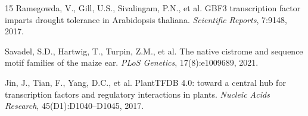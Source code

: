 \documentclass[11pt,a4paper]{article}
\begin{document}
\begin{thebibliography}{15}
Ramegowda, V., Gill, U.S., Sivalingam, P.N., et al.
\newblock GBF3 transcription factor imparts drought tolerance in Arabidopsis thaliana.
\newblock \textit{Scientific Reports}, 7:9148, 2017.

Savadel, S.D., Hartwig, T., Turpin, Z.M., et al.
\newblock The native cistrome and sequence motif families of the maize ear.
\newblock \textit{PLoS Genetics}, 17(8):e1009689, 2021.

Jin, J., Tian, F., Yang, D.C., et al.
\newblock PlantTFDB 4.0: toward a central hub for transcription factors and regulatory interactions in plants.
\newblock \textit{Nucleic Acids Research}, 45(D1):D1040--D1045, 2017.

\end{thebibliography}
\end{document}
